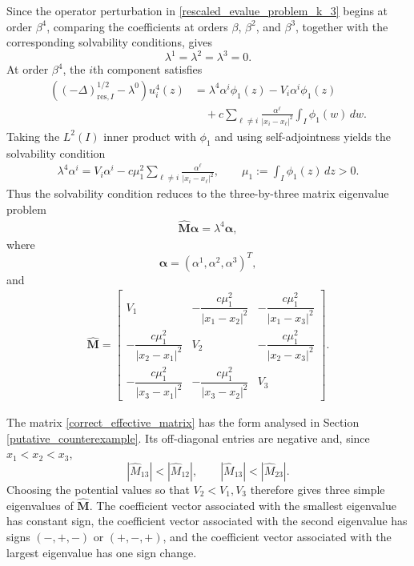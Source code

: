 \documentclass[preprint,12pt]{elsarticle}
\newcommand{\M}{\mathbf{M}}
\newcommand{\fvect}[1]{\mathbf{#1}}
\begin{document}
Since the operator perturbation in \eqref{rescaled_evalue_problem_k_3}
begins at order $\beta^4$, comparing the coefficients at orders
$\beta$, $\beta^2$, and $\beta^3$, together with the corresponding
solvability conditions, gives
\[
    \lambda^1=\lambda^2=\lambda^3=0.
\]
At order $\beta^4$, the $i$th component satisfies
\begin{align}\label{fourth_order_pert}
 \left((-\Delta)^{1/2}_{\mathrm{res},I}-\lambda^0\right)u_i^4(z)
 &=\lambda^4\alpha^i\phi_1(z)-V_i\alpha^i\phi_1(z)\nonumber\\
 &\quad+c\sum_{\ell\neq i}\frac{\alpha^\ell}{|x_i-x_\ell|^2}
       \int_I\phi_1(w)\,dw.
\end{align}
Taking the $L^2(I)$ inner product with $\phi_1$ and using
self-adjointness yields the solvability condition
\begin{align}\label{effective_matrix_equations}
    \lambda^4\alpha^i
    =V_i\alpha^i
     -c\mu_1^2\sum_{\ell\neq i}
       \frac{\alpha^\ell}{|x_i-x_\ell|^2},
    \qquad
    \mu_1:=\int_I\phi_1(z)\,dz>0.
\end{align}
Thus the solvability condition reduces to the three-by-three matrix
eigenvalue problem
\begin{align}\label{evalue_eqn_pert_matrix}
    \widehat{\M}\fvect{\alpha}
    =\lambda^4\fvect{\alpha},
\end{align}
where
\[
    \fvect{\alpha}
    =
    (\alpha^1,\alpha^2,\alpha^3)^T,
\]
and
\begin{align}\label{correct_effective_matrix}
 \widehat{\M}
 =\begin{bmatrix}
 V_1 & -\dfrac{c\mu_1^2}{|x_1-x_2|^2}
     & -\dfrac{c\mu_1^2}{|x_1-x_3|^2}\\[8pt]
 -\dfrac{c\mu_1^2}{|x_2-x_1|^2} & V_2
     & -\dfrac{c\mu_1^2}{|x_2-x_3|^2}\\[8pt]
 -\dfrac{c\mu_1^2}{|x_3-x_1|^2}
     & -\dfrac{c\mu_1^2}{|x_3-x_2|^2} & V_3
 \end{bmatrix}.
\end{align}

The matrix \eqref{correct_effective_matrix} has the form analysed in Section \ref{putative_counterexample}. Its off-diagonal entries are negative and, since $x_1<x_2<x_3$,
\[
    |\widehat M_{13}|<|\widehat M_{12}|,
    \qquad
    |\widehat M_{13}|<|\widehat M_{23}|.
\]
Choosing the potential values so that $V_2<V_1,V_3$ therefore gives three simple eigenvalues of $\widehat{\M}$. The coefficient vector associated with the smallest eigenvalue has constant sign, the coefficient vector associated with the second eigenvalue has signs $(-,+,-)$ or $(+,-,+)$, and the coefficient vector associated with the largest eigenvalue has one sign change.
\end{document}
